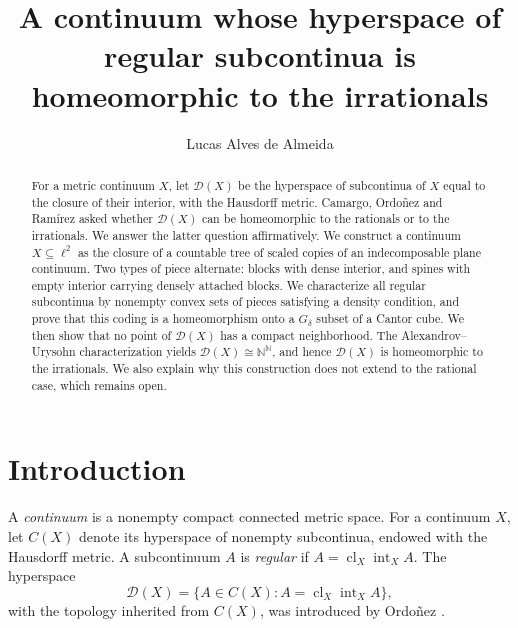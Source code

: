 \documentclass[11pt]{amsart}
\theoremstyle{definition}
\theoremstyle{remark}
\newcommand{\clX}{\operatorname{cl}_X}
\newcommand{\intX}{\operatorname{int}_X}
\newcommand{\D}{\mathcal{D}}
\newcommand{\N}{\mathbb{N}}
\begin{document}
\title[Regular subcontinua and the irrationals]{A continuum whose hyperspace of regular subcontinua is homeomorphic to the irrationals}

\author{Lucas Alves de Almeida}
\address{Independent researcher}




\begin{abstract}
For a metric continuum $X$, let $\D(X)$ be the hyperspace of subcontinua of $X$ equal to the closure of their interior, with the Hausdorff metric. Camargo, Ordo\~nez and Ram\'irez asked whether $\D(X)$ can be homeomorphic to the rationals or to the irrationals. We answer the latter question affirmatively. We construct a continuum $X\subseteq\ell^2$ as the closure of a countable tree of scaled copies of an indecomposable plane continuum. Two types of piece alternate: blocks with dense interior, and spines with empty interior carrying densely attached blocks. We characterize all regular subcontinua by nonempty convex sets of pieces satisfying a density condition, and prove that this coding is a homeomorphism onto a $G_\delta$ subset of a Cantor cube. We then show that no point of $\D(X)$ has a compact neighborhood. The Alexandrov--Urysohn characterization yields $\D(X)\cong\N^\N$, and hence $\D(X)$ is homeomorphic to the irrationals. We also explain why this construction does not extend to the rational case, which remains open.
\end{abstract}

\maketitle

\section{Introduction}\label{sec:intro}

A \emph{continuum} is a nonempty compact connected metric space. For a continuum $X$, let $C(X)$ denote its hyperspace of nonempty subcontinua, endowed with the Hausdorff metric. A subcontinuum $A$ is \emph{regular} if $A=\clX\intX A$. The hyperspace
\[
\D(X)=\{A\in C(X): A=\clX\intX A\},
\]
with the topology inherited from $C(X)$, was introduced by Ordo\~nez \cite{Or18}.
\end{document}
